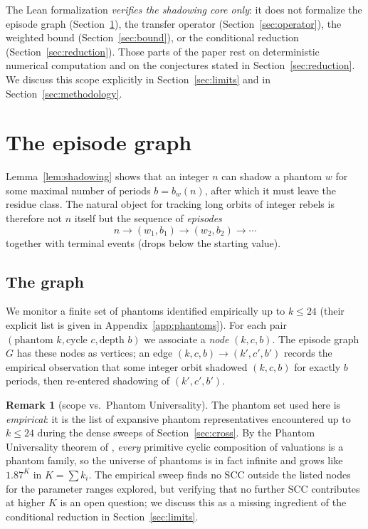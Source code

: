 \documentclass[11pt,a4paper]{article}
\theoremstyle{definition}
\newtheorem{remark}[theorem]{Remark}
\begin{document}
The Lean formalization \emph{verifies the shadowing core only}: it
does not formalize the episode graph
(Section~\ref{sec:episodes}), the transfer operator
(Section~\ref{sec:operator}), the weighted bound
(Section~\ref{sec:bound}), or the conditional reduction
(Section~\ref{sec:reduction}). Those parts of the paper rest on
deterministic numerical computation and on the conjectures stated
in Section~\ref{sec:reduction}. We discuss this scope explicitly
in Section~\ref{sec:limits} and in
Section~\ref{sec:methodology}.

\section{The episode graph}
\label{sec:episodes}

Lemma~\ref{lem:shadowing} shows that an integer $n$ can shadow a
phantom $w$ for some maximal number of periods $b = b_w(n)$, after
which it must leave the residue class. The natural object for
tracking long orbits of integer rebels is therefore not $n$ itself
but the sequence of \emph{episodes}
\[
n \to (w_1, b_1) \to (w_2, b_2) \to \cdots
\]
together with terminal events (drops below the starting value).

\subsection{The graph}

We monitor a finite set of phantoms identified empirically up to
$k\le 24$ (their explicit list is given in
Appendix~\ref{app:phantoms}). For each pair
$(\text{phantom }k, \text{cycle }c, \text{depth }b)$ we associate a
\emph{node} $(k,c,b)$. The episode graph $G$ has these nodes as
vertices; an edge $(k,c,b) \to (k',c',b')$ records the empirical
observation that some integer orbit shadowed $(k,c,b)$ for exactly
$b$ periods, then re-entered shadowing of $(k',c',b')$.

\begin{remark}[scope vs.\ Phantom Universality]
\label{rem:scope-vs-universality}
The phantom set used here is \emph{empirical}: it is the list of
expansive phantom representatives encountered up to $k \le 24$
during the dense sweeps of Section~\ref{sec:cross}. By the
Phantom Universality theorem of \cite[Theorem~7.15]{chang2026},
\emph{every} primitive cyclic composition of valuations is a
phantom family, so the universe of phantoms is in fact infinite
and grows like $1.87^K$ in $K = \sum k_i$. The empirical sweep
finds no SCC outside the listed nodes for the parameter ranges
explored, but verifying that no further SCC contributes at higher
$K$ is an open question; we discuss this as a missing ingredient
of the conditional reduction in Section~\ref{sec:limits}.
\end{remark}
\end{document}
